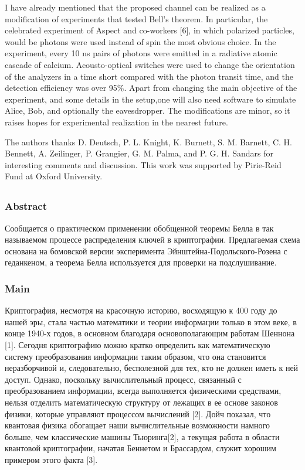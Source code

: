 I have already mentioned that the proposed channel can be realized as a modification of experiments that tested Bell's theorem. In particular, the celebrated experiment of Aspect and co-workers [6], in which polarized particles, would be photons were used instead of spin the most obvious choice. In the experiment, every 10 ns pairs of photons were emitted in a radiative atomic cascade of calcium. Acousto-optical switches were used to change the orientation of the analyzers in a time short compared with the photon transit time, and the detection efficiency was over 95\%. Apart from changing the main objective of the experiment, and some details in the setup,one will also need software to simulate Alice, Bob, and optionally the eavesdropper. The modifications are minor, so it raises hopes for experimental realization in the nearest future.

The authors thanks D. Deutsch, P. L. Knight, K. Burnett, S. M. Barnett, C. H. Bennett, A. Zeilinger, P. Grangier, G. M. Palma, and P. G. H. Sandars for interesting comments and discussion. This work was supported by Pirie-Reid Fund at Oxford University.

\subsection{\trnas}


\subsubsection*{Abstract}

Сообщается о практическом применении обобщенной теоремы Белла в так называемом процессе распределения ключей в криптографии. Предлагаемая схема основана на бомовской версии эксперимента Эйнштейна-Подольского-Розена с геданкеном, а теорема Белла используется для проверки на подслушивание.

\subsubsection{Main}

Криптография, несмотря на красочную историю, восходящую к 400 году до нашей эры, стала частью математики и теории информации только в этом веке, в конце 1940-х годов, в основном благодаря основополагающим работам Шеннона [1]. Сегодня криптографию можно кратко определить как математическую систему преобразования информации таким образом, что она становится неразборчивой и, следовательно, бесполезной для тех, кто не должен иметь к ней доступ. Однако, поскольку вычислительный процесс, связанный с преобразованием информации, всегда выполняется физическими средствами, нельзя отделить математическую структуру от лежащих в ее основе законов физики, которые управляют процессом вычислений [2]. Дойч показал, что квантовая физика обогащает наши вычислительные возможности намного больше, чем классические машины Тьюринга[2], а текущая работа в области квантовой криптографии, начатая Беннетом и Брассардом, служит хорошим примером этого факта [3].


